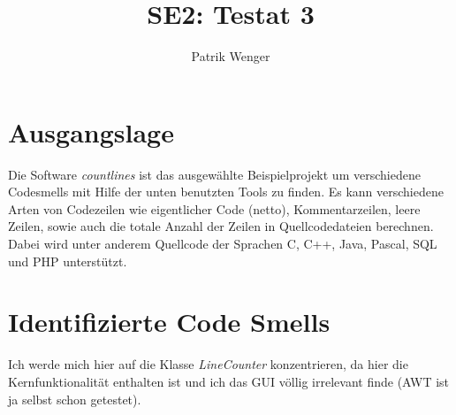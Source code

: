\documentclass[a4paper]{article}
\title{SE2: Testat 3}
\author{Patrik Wenger}
\begin{document}
\maketitle
\tableofcontents

\section{Ausgangslage}
Die Software \emph{countlines} ist das ausgew\"ahlte Beispielprojekt um
verschiedene Codesmells mit Hilfe der unten benutzten Tools zu finden. Es kann
verschiedene Arten von Codezeilen wie eigentlicher Code (netto),
Kommentarzeilen, leere Zeilen, sowie auch die totale Anzahl der Zeilen in
Quellcodedateien berechnen.  Dabei wird unter anderem Quellcode der Sprachen C,
C++, Java, Pascal, SQL und PHP unterst\"utzt.\\

\section{Identifizierte Code Smells}
Ich werde mich hier auf die Klasse \emph{LineCounter} konzentrieren, da hier
die Kernfunktionalit\"at enthalten ist und ich das GUI v\"ollig irrelevant
finde (AWT ist ja selbst schon getestet).
\end{document}
